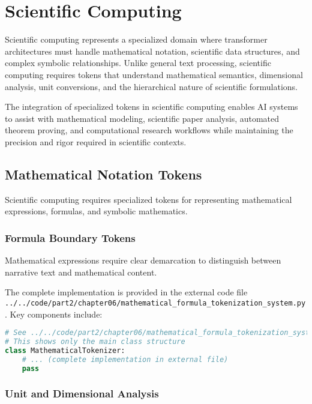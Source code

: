 
\section{Scientific Computing}

Scientific computing represents a specialized domain where transformer architectures must handle mathematical notation, scientific data structures, and complex symbolic relationships. Unlike general text processing, scientific computing requires tokens that understand mathematical semantics, dimensional analysis, unit conversions, and the hierarchical nature of scientific formulations.

The integration of specialized tokens in scientific computing enables AI systems to assist with mathematical modeling, scientific paper analysis, automated theorem proving, and computational research workflows while maintaining the precision and rigor required in scientific contexts.

\subsection{Mathematical Notation Tokens}

Scientific computing requires specialized tokens for representing mathematical expressions, formulas, and symbolic mathematics.

\subsubsection{Formula Boundary Tokens}

Mathematical expressions require clear demarcation to distinguish between narrative text and mathematical content.

The complete implementation is provided in the external code file \texttt{../../code/part2/chapter06/mathematical\_formula\_tokenization\_system.py}. Key components include:

\begin{lstlisting}[language=Python, caption=Core structure (see external file for complete implementation)]
# See ../../code/part2/chapter06/mathematical_formula_tokenization_system.py for the complete implementation
# This shows only the main class structure
class MathematicalTokenizer:
    # ... (complete implementation in external file)
    pass
\end{lstlisting}
\subsubsection{Unit and Dimensional Analysis}

